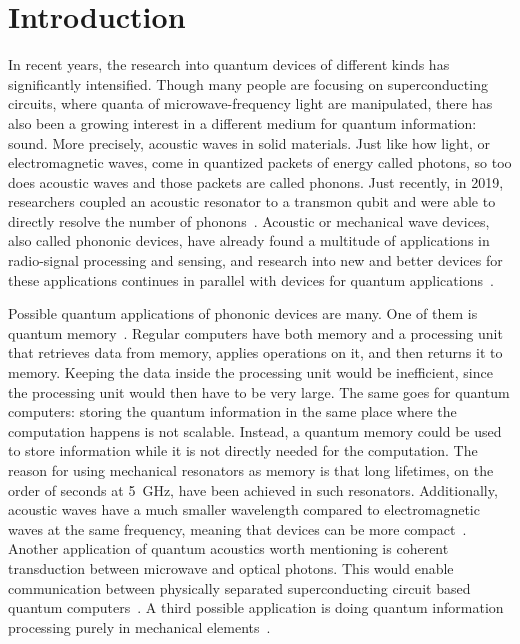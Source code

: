 \chapter{Introduction}

In recent years, the research into quantum devices of different kinds has
significantly intensified.
Though many people are focusing on superconducting circuits, where quanta of
microwave-frequency light are manipulated, there has also been
a growing interest in a different medium for quantum information: sound.
More precisely, acoustic waves in solid materials.
Just like how light, or electromagnetic waves, come in quantized packets of energy called
photons,
so too does acoustic waves and those packets are called phonons.
Just recently, in 2019, researchers coupled an acoustic resonator to a transmon
qubit and were able to directly resolve the number of phonons~\cite{arrangoiz-arriola_resolving_2019}.
Acoustic or mechanical wave devices, also called phononic devices, have already
found a multitude of applications in radio-signal processing and sensing, and
research into new and better devices for these applications continues in
parallel with devices for quantum applications~\cite{laer_controlling_2019}.

Possible quantum applications of phononic devices are many.
One of them is quantum memory~\cite{sete_high-efficiency_2015}.
Regular computers have both memory and a processing unit that
retrieves data from memory, applies operations on it, and then returns it to
memory.
Keeping the data inside the processing unit would be inefficient,
since the processing unit would then have to be very large.
The same goes for quantum computers: storing the quantum information in
the same place where the computation happens is not scalable.
Instead, a quantum memory could be used to store information while it is not
directly needed for the computation.
The reason for using mechanical resonators as memory is that long lifetimes, on
the order of seconds at \qty{5}{\giga\hertz}, have been achieved in such
resonators.
Additionally, acoustic waves have a much smaller wavelength compared to
electromagnetic waves at the same frequency, meaning that devices can be more
compact~\cite{maccabe_phononic_2020}.
Another application of quantum acoustics worth mentioning is
coherent transduction between microwave and optical photons.
This would enable communication between physically separated superconducting
circuit based quantum computers~\cite{laer_controlling_2019}.
A third possible application is doing quantum information processing purely in
mechanical elements~\cite{qiao2023developing}.

